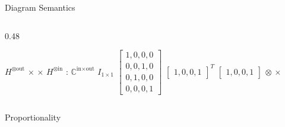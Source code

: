 \documentclass[final]{beamer}
\newlength{\colwidth}
\newcommand{\C}{\mathbb{C}}
\begin{document}
\begin{frame}[t]
\begin{columns}[t]
\begin{column}{\colwidth}
\begin{block}{Diagram Semantics}
\begin{columns}
\begin{column}{0.48\colwidth}
\begin{algorithm}[H]
\begin{algorithmic}
            \State \Return \(H^{\otimes\text{out}}\) \(\times\)  \(\times\) \(H^{\otimes\text{in}}\)
          \EndFunction
             : \(\C^{\text{in} \times \text{out}}\)
                  \State \Return $I_{1 \times 1}$ \EndCase
                  \State \Return \(\begin{bmatrix}1,0,0,0\\0,0,1,0\\0,1,0,0\\0,0,0,1\end{bmatrix}\) \EndCase
                  \State \Return \(\begin{bmatrix}1,0,0,1\end{bmatrix}^T\) \EndCase
                  \State \Return \(\begin{bmatrix}1,0,0,1\end{bmatrix}\) \EndCase
                  \State \Return {} \EndCase
                  \State \Return {} \EndCase
                  \State \Return {} $\otimes$  \EndCase
                  \State \Return {} $\times$  \EndCase
                \EndSwitch
            \EndFunction
          \end{algorithmic}
        \end{algorithm}
      \end{column}
    \end{columns}
  \end{block}

  \begin{block}{Proportionality}


\end{block}
\end{column}
\end{columns}
\end{frame}
\end{document}
